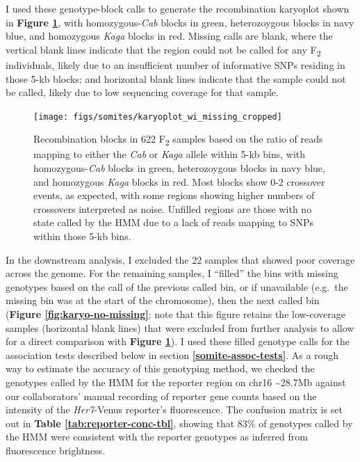 \documentclass[
]{book}
\begin{document}
\clearpage

I used these genotype-block calls to generate the recombination karyoplot shown in \textbf{Figure \ref{fig:karyo-wi-missing}}, with homozygous-\emph{Cab} blocks in green, heterozoygous blocks in navy blue, and homozygous \emph{Kaga} blocks in red. Missing calls are blank, where the vertical blank lines indicate that the region could not be called for any F\textsubscript{2} individuals, likely due to an insufficient number of informative SNPs residing in those 5-kb blocks; and horizontal blank lines indicate that the sample could not be called, likely due to low sequencing coverage for that sample.



\begin{figure}

{\centering \texttt{[image: figs/somites/karyoplot\_wi\_missing\_cropped]} 

}

\caption{Recombination blocks in 622 F\textsubscript{2} samples based on the ratio of reads mapping to either the \emph{Cab} or \emph{Kaga} allele within 5-kb bins, with homozygous-\emph{Cab} blocks in green, heterozoygous blocks in navy blue, and homozygous \emph{Kaga} blocks in red. Most blocks show 0-2 crossover events, as expected, with some regions showing higher numbers of crossovers interpreted as noise. Unfilled regions are those with no state called by the HMM due to a lack of reads mapping to SNPs within those 5-kb bins.}\label{fig:karyo-wi-missing}
\end{figure}

In the downstream analysis, I excluded the 22 samples that showed poor coverage across the genome. For the remaining samples, I ``filled'' the bins with missing genotypes based on the call of the previous called bin, or if unavailable (e.g.~the missing bin was at the start of the chromosome), then the next called bin (\textbf{Figure \ref{fig:karyo-no-missing}}; note that this figure retains the low-coverage samples (horizontal blank lines) that were excluded from further analysis to allow for a direct comparison with \textbf{Figure \ref{fig:karyo-wi-missing}}). I used these filled genotype calls for the association tests described below in section \textbf{\ref{somite-assoc-tests}}. As a rough way to estimate the accuracy of this genotyping method, we checked the genotypes called by the HMM for the reporter region on chr16 \textasciitilde28.7Mb against our collaborators' manual recording of reporter gene counts based on the intensity of the \emph{Her7}-Venus reporter's fluorescence. The confusion matrix is set out in \textbf{Table \ref{tab:reporter-conc-tbl}}, showing that 83\% of genotypes called by the HMM were consistent with the reporter genotypes as inferred from fluorescence brightness.
\end{document}
